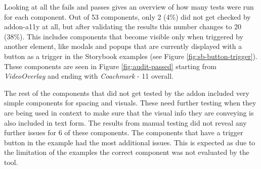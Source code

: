 \documentclass{master_thesis}
\begin{document}
Looking at all the fails and passes gives an overview of how many tests were run for each component. Out of 53 components, only 2 (4\%) did not get checked by addon-a11y at all, but after validating the results this number changes to 20 (38\%). This includes components that become visible only when triggered by another element, like modals and popups that are currently displayed with a button as a trigger in the Storybook examples (see Figure \ref{fig:sb-button-trigger}). These components are seen in Figure \ref{fig:audit-passed} starting from \textit{VideoOverlay} and ending with \textit{Coachmark} - 11 overall.

The rest of the components that did not get tested by the addon included very simple components for spacing and visuals. These need further testing when they are being used in context to make sure that the visual info they are conveying is also included in text form. The results from manual testing did not reveal any further issues for 6 of these components. The components that have a trigger button in the example had the most additional issues. This is expected as due to the limitation of the examples the correct component was not evaluated by the tool.
\end{document}
